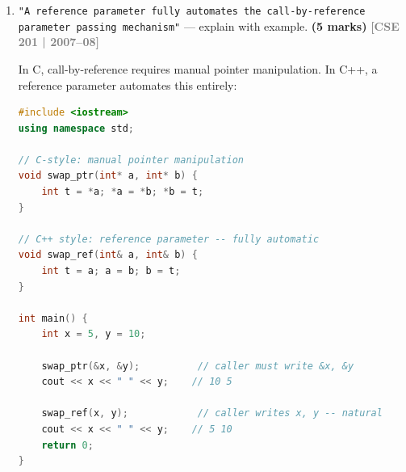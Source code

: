 \documentclass[12pt,a3paper]{article}
\newcommand{\yr}[1]{\hfill\textcolor{gray}{\small\textbf{[#1]}}}
\newcommand{\mk}[1]{\textcolor{orange!70!black}{\small\textbf{(#1 marks)}}}
\begin{document}
\begin{enumerate}
\begin{tcolorbox}
\begin{lstlisting}[language=C++]
int val = 100;      // global

namespace Math { double pi = 3.14; }

class Circle {
    double r;
public:
    Circle(double r) : r(r) {}
    static double pi;
    double area();
};
double Circle::pi = 3.14159;      // binary :: -- defines static member
double Circle::area() {            // binary :: -- defines member function
    return Circle::pi * r * r;    // binary :: -- accesses static member
}

int main() {
    int val = 200;                 // local
    cout << val    << "\n";        // 200 -- local
    cout << ::val  << "\n";        // 100 -- unary :: global

    cout << Math::pi << "\n";      // 3.14 -- binary :: namespace

    Circle c(5.0);
    cout << c.area() << "\n";      // 78.5...
    return 0;
}
\end{lstlisting}

\end{tcolorbox}


\item \texttt{"A reference parameter fully automates the call-by-reference parameter passing mechanism"} --- explain with example. \mk{5}
\yr{CSE 201 | 2007--08}

\begin{tcolorbox}[enhanced,breakable,ansbox,colback=cC!4,colframe=cC,
  boxrule=0.8pt,arc=5pt,
  title={\textbf{Answer --- Reference parameter automates call-by-reference}},
  fonttitle=\bfseries\color{white},colbacktitle=cC]

In C, call-by-reference requires manual pointer manipulation.
In C++, a reference parameter automates this entirely:

\begin{lstlisting}[language=C++]
#include <iostream>
using namespace std;

// C-style: manual pointer manipulation
void swap_ptr(int* a, int* b) {
    int t = *a; *a = *b; *b = t;
}

// C++ style: reference parameter -- fully automatic
void swap_ref(int& a, int& b) {
    int t = a; a = b; b = t;
}

int main() {
    int x = 5, y = 10;

    swap_ptr(&x, &y);          // caller must write &x, &y
    cout << x << " " << y;    // 10 5

    swap_ref(x, y);            // caller writes x, y -- natural
    cout << x << " " << y;    // 5 10
    return 0;
}
\end{lstlisting}


\end{tcolorbox}
\end{enumerate}
\end{document}
